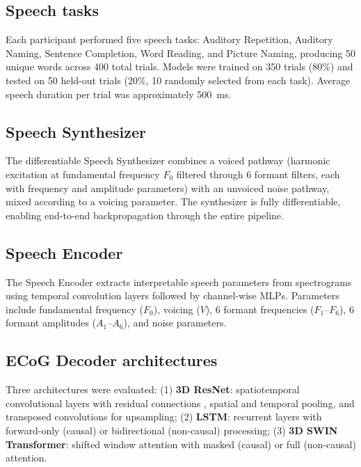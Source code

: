 \documentclass[11pt]{article}
\begin{document}
\subsection{Speech tasks}

Each participant performed five speech tasks: Auditory Repetition, Auditory Naming, Sentence Completion, Word Reading, and Picture Naming, producing 50 unique words across 400 total trials. Models were trained on 350 trials (80\%) and tested on 50 held-out trials (20\%, 10 randomly selected from each task). Average speech duration per trial was approximately 500~ms.

\subsection{Speech Synthesizer}

The differentiable Speech Synthesizer combines a voiced pathway (harmonic excitation at fundamental frequency $F_0$ filtered through 6 formant filters, each with frequency and amplitude parameters) with an unvoiced noise pathway, mixed according to a voicing parameter. The synthesizer is fully differentiable, enabling end-to-end backpropagation through the entire pipeline.

\subsection{Speech Encoder}

The Speech Encoder extracts interpretable speech parameters from spectrograms using temporal convolution layers followed by channel-wise MLPs. Parameters include fundamental frequency ($F_0$), voicing ($V$), 6 formant frequencies ($F_1$--$F_6$), 6 formant amplitudes ($A_1$--$A_6$), and noise parameters.

\subsection{ECoG Decoder architectures}

Three architectures were evaluated: (1) \textbf{3D ResNet}: spatiotemporal convolutional layers with residual connections \citep{he2016}, spatial and temporal pooling, and transposed convolutions for upsampling; (2) \textbf{LSTM}: recurrent layers \citep{hochreiter1997} with forward-only (causal) or bidirectional (non-causal) processing; (3) \textbf{3D SWIN Transformer}: shifted window attention \citep{liu2021} with masked (causal) or full (non-causal) attention.
\end{document}
